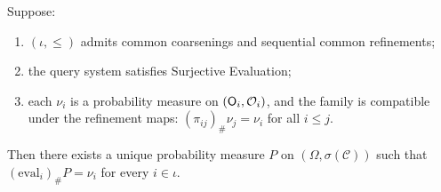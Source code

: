 \begin{theorem}
\label{thm:obs-extension}
Suppose:
\begin{enumerate}[label=(\roman*)]
  \item $(\iota, \leq)$ admits common coarsenings and sequential common
        refinements;
  \item the query system satisfies Surjective Evaluation;
  \item each $\nu_i$ is a probability measure on $(\mathsf{O}_{i}, \mathcal{O}_i)$,
        and the family is compatible under the refinement maps: $(\pi_{ij})_\# \nu_j = \nu_i$ for all $i \leq j$.
\end{enumerate}
Then there exists a unique probability measure $P$ on $(\Omega, \sigma(\mathcal{C}))$ such that $(\mathrm{eval}_i)_\# P = \nu_i$ for every $i \in \iota$.
\end{theorem}

